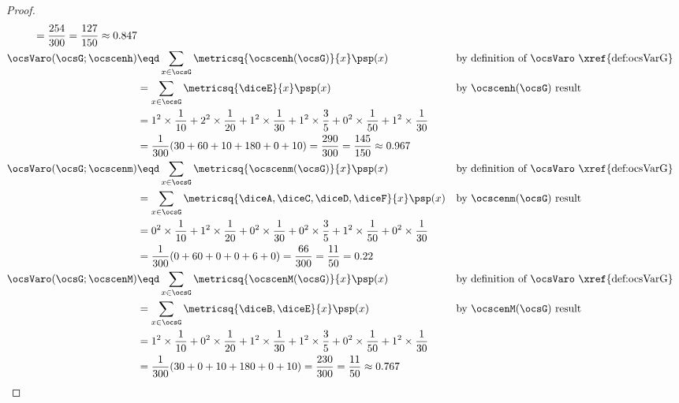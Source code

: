 \begin{tabstr}{0.75}
\begin{proof}
\begin{align*}
     = \frac{254}{300}
     = \frac{127}{150}
     \approx 0.847
  \\
  \ocsVaro(\ocsG;\ocscenh)
    &\eqd \sum_{x\in\ocsG}\metricsq{\ocscenh(\ocsG)}{x} \psp(x)
    &&\text{by definition of $\ocsVaro$ \xref{def:ocsVarG}}
  \\&= \sum_{x\in\ocsG}\metricsq{\diceE}{x} \psp(x)
    &&\text{by $\ocscenh(\ocsG)$ result}
  \\&= 1^2\times\frac{1}{10} + 2^2\times\frac{1}{20} + 1^2\times\frac{1}{30} + 
       1^2\times\frac{3}{5}  + 0^2\times\frac{1}{50} + 1^2\times\frac{1}{30}  
  \\&= \frac{1}{300}(30+60+10 + 180+0+10)
     = \frac{290}{300}
     = \frac{145}{150}
     \approx 0.967
  \\
  \ocsVaro(\ocsG;\ocscenm)
    &\eqd \sum_{x\in\ocsG}\metricsq{\ocscenm(\ocsG)}{x} \psp(x)
    &&\text{by definition of $\ocsVaro$ \xref{def:ocsVarG}}
  \\&= \sum_{x\in\ocsG}\metricsq{\diceA,\diceC,\diceD,\diceF}{x} \psp(x)
    &&\text{by $\ocscenm(\ocsG)$ result}
  \\&= 0^2\times\frac{1}{10} + 1^2\times\frac{1}{20} + 0^2\times\frac{1}{30} + 
       0^2\times\frac{3}{5}  + 1^2\times\frac{1}{50} + 0^2\times\frac{1}{30}  
  \\&= \frac{1}{300}( 0+60+ 0 +   0+6+ 0)
     = \frac{ 66}{300}
     = \frac{ 11}{ 50}
     =       0.22 
  \\
  \ocsVaro(\ocsG;\ocscenM)
    &\eqd \sum_{x\in\ocsG}\metricsq{\ocscenM(\ocsG)}{x} \psp(x)
    &&\text{by definition of $\ocsVaro$ \xref{def:ocsVarG}}
  \\&= \sum_{x\in\ocsG}\metricsq{\diceB,\diceE}{x} \psp(x)
    &&\text{by $\ocscenM(\ocsG)$ result}
  \\&= 1^2\times\frac{1}{10} + 0^2\times\frac{1}{20} + 1^2\times\frac{1}{30} + 
       1^2\times\frac{3}{5}  + 0^2\times\frac{1}{50} + 1^2\times\frac{1}{30}  
  \\&= \frac{1}{300}(30+ 0+10 + 180+0+10)
     = \frac{230}{300}
     = \frac{ 11}{ 50}
     \approx 0.767
\end{align*}
\end{proof}



\end{tabstr}
